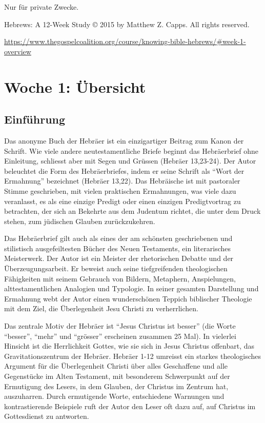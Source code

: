 \documentclass[]{krantz}
\begin{document}
Nur für private Zwecke.

Hebrews: A 12-Week Study © 2015 by Matthew Z. Capps. All rights
reserved.

\url{https://www.thegospelcoalition.org/course/knowing-bible-hebrews/\#week-1-overview}

\hypertarget{woche01}{\chapter{Woche 1: Übersicht}\label{woche01}}

\section{Einführung}\label{einfuxfchrung}

Das anonyme Buch der Hebräer ist ein einzigartiger Beitrag zum Kanon der
Schrift. Wie viele andere neutestamentliche Briefe beginnt das
Hebräerbrief ohne Einleitung, schliesst aber mit Segen und Grüssen
({Hebräer 13,23-24}). Der Autor beleuchtet die Form des Hebräerbriefes,
indem er seine Schrift als ``Wort der Ermahnung'' bezeichnet ({Hebräer
13,22}). Das Hebräische ist mit pastoraler Stimme geschrieben, mit
vielen praktischen Ermahnungen, was viele dazu veranlasst, es als eine
einzige Predigt oder einen einzigen Predigtvortrag zu betrachten, der
sich an Bekehrte aus dem Judentum richtet, die unter dem Druck stehen,
zum jüdischen Glauben zurückzukehren.

Das Hebräerbrief gilt auch als eines der am schönsten geschriebenen und
stilistisch ausgefeiltesten Bücher des Neuen Testaments, ein
literarisches Meisterwerk. Der Autor ist ein Meister der rhetorischen
Debatte und der Überzeugungsarbeit. Er beweist auch seine tiefgreifenden
theologischen Fähigkeiten mit seinem Gebrauch von Bildern, Metaphern,
Anspielungen, alttestamentlichen Analogien und Typologie. In seiner
gesamten Darstellung und Ermahnung webt der Autor einen wunderschönen
Teppich biblischer Theologie mit dem Ziel, die Überlegenheit Jesu
Christi zu verherrlichen.

Das zentrale Motiv der Hebräer ist ``Jesus Christus ist besser'' (die
Worte ``besser'', ``mehr'' und ``grösser'' erscheinen zusammen 25 Mal).
In vielerlei Hinsicht ist die Herrlichkeit Gottes, wie sie sich in Jesus
Christus offenbart, das Gravitationszentrum der Hebräer. Hebräer 1-12
umreisst ein starkes theologisches Argument für die Überlegenheit
Christi über alles Geschaffene und alle Gegenstücke im Alten Testament,
mit besonderem Schwerpunkt auf der Ermutigung des Lesers, in dem
Glauben, der Christus im Zentrum hat, auszuharren. Durch ermutigende
Worte, entschiedene Warnungen und kontrastierende Beispiele ruft der
Autor den Leser oft dazu auf, auf Christus im Gottesdienst zu antworten.
\end{document}
